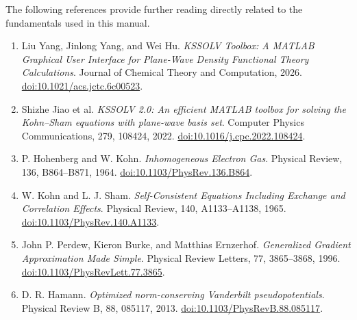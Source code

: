 The following references provide further reading directly related to the fundamentals used in this manual.

\begingroup
\small
\RaggedRight
\begin{enumerate}[itemsep=4pt]
\item Liu Yang, Jinlong Yang, and Wei Hu. \textit{KSSOLV Toolbox: A MATLAB\regmark{} Graphical User Interface for Plane-Wave Density Functional Theory Calculations}. Journal of Chemical Theory and Computation, 2026. \href{https://doi.org/10.1021/acs.jctc.6c00523}{doi:10.1021/acs.jctc.6c00523}.
\item Shizhe Jiao et al. \textit{KSSOLV 2.0: An efficient MATLAB\regmark{} toolbox for solving the Kohn--Sham equations with plane-wave basis set}. Computer Physics Communications, 279, 108424, 2022. \href{https://doi.org/10.1016/j.cpc.2022.108424}{doi:10.1016/j.cpc.2022.108424}.
\item P. Hohenberg and W. Kohn. \textit{Inhomogeneous Electron Gas}. Physical Review, 136, B864--B871, 1964. \href{https://doi.org/10.1103/PhysRev.136.B864}{doi:10.1103/PhysRev.136.B864}.
\item W. Kohn and L. J. Sham. \textit{Self-Consistent Equations Including Exchange and Correlation Effects}. Physical Review, 140, A1133--A1138, 1965. \href{https://doi.org/10.1103/PhysRev.140.A1133}{doi:10.1103/PhysRev.140.A1133}.
\item John P. Perdew, Kieron Burke, and Matthias Ernzerhof. \textit{Generalized Gradient Approximation Made Simple}. Physical Review Letters, 77, 3865--3868, 1996. \href{https://doi.org/10.1103/PhysRevLett.77.3865}{doi:10.1103/PhysRevLett.77.3865}.
\item D. R. Hamann. \textit{Optimized norm-conserving Vanderbilt pseudopotentials}. Physical Review B, 88, 085117, 2013. \href{https://doi.org/10.1103/PhysRevB.88.085117}{doi:10.1103/PhysRevB.88.085117}.
\end{enumerate}

\endgroup
